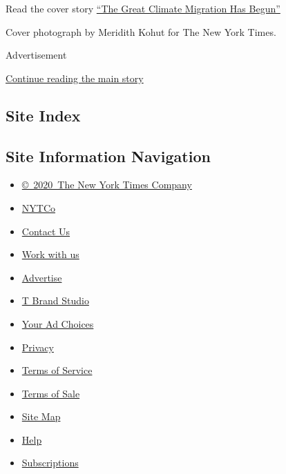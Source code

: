 Read the cover story
\href{https://www.nytimes.com/interactive/2020/07/23/magazine/climate-migration.html}{``The
Great Climate Migration Has Begun''}

Cover photograph by Meridith Kohut for The New York Times.

Advertisement

\protect\hyperlink{after-bottom}{Continue reading the main story}

\hypertarget{site-index}{%
\subsection{Site Index}\label{site-index}}

\hypertarget{site-information-navigation}{%
\subsection{Site Information
Navigation}\label{site-information-navigation}}

\begin{itemize}
\tightlist
\item
  \href{https://help.nytimes.com/hc/en-us/articles/115014792127-Copyright-notice}{©~2020~The
  New York Times Company}
\end{itemize}

\begin{itemize}
\tightlist
\item
  \href{https://www.nytco.com/}{NYTCo}
\item
  \href{https://help.nytimes.com/hc/en-us/articles/115015385887-Contact-Us}{Contact
  Us}
\item
  \href{https://www.nytco.com/careers/}{Work with us}
\item
  \href{https://nytmediakit.com/}{Advertise}
\item
  \href{http://www.tbrandstudio.com/}{T Brand Studio}
\item
  \href{https://www.nytimes.com/privacy/cookie-policy\#how-do-i-manage-trackers}{Your
  Ad Choices}
\item
  \href{https://www.nytimes.com/privacy}{Privacy}
\item
  \href{https://help.nytimes.com/hc/en-us/articles/115014893428-Terms-of-service}{Terms
  of Service}
\item
  \href{https://help.nytimes.com/hc/en-us/articles/115014893968-Terms-of-sale}{Terms
  of Sale}
\item
  \href{https://spiderbites.nytimes.com}{Site Map}
\item
  \href{https://help.nytimes.com/hc/en-us}{Help}
\item
  \href{https://www.nytimes.com/subscription?campaignId=37WXW}{Subscriptions}
\end{itemize}
